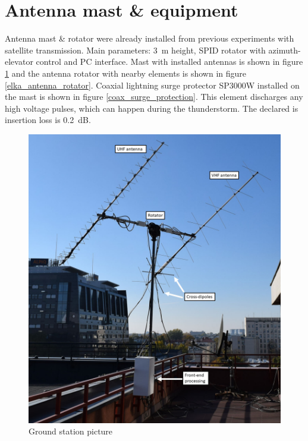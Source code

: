 \section{Antenna mast \& equipment}
Antenna mast \& rotator were already installed from previous experiments with satellite transmission. Main parameters: \SI{3}{\meter} height, SPID rotator with azimuth-elevator control and PC interface. Mast with installed antennas is shown in figure \ref{elka_antena_mast} and the antenna rotator with nearby elements is shown in figure \ref{elka_antenna_rotator}. Coaxial lightning surge protector SP3000W installed on the mast is shown in figure \ref{coax_surge_protection}. This element discharges any high voltage pulses, which can happen during the thunderstorm. The declared is insertion loss is \SI{0.2}{\dB}.

\begin{figure}[H]
    \centering
    \includegraphics[width=0.45\paperwidth]{img/7/elka_antena_mast.jpg}
    \caption{Ground station picture}
    \label{elka_antena_mast}
\end{figure}


